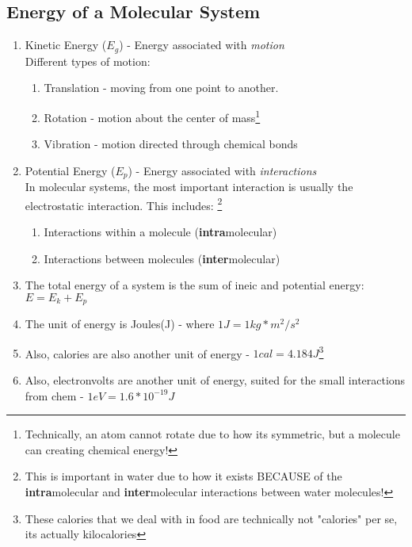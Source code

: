 \documentclass{article}  %
\begin{document}
\subsection*{Energy of a Molecular System}
\begin{enumerate}
    \item Kinetic Energy ($E_g$) - Energy associated with \emph{motion} \\
    Different types of motion:
        \begin{enumerate}
            \item Translation - moving from one point to another.
            \item Rotation - motion about the center of mass\footnote{Technically, an atom cannot rotate due to how its symmetric, but a molecule can creating chemical energy!}
            \item Vibration - motion directed through chemical bonds
        \end{enumerate}
    \item Potential Energy ($E_p$) - Energy associated with \emph{interactions} \\
    In molecular systems, the most important interaction is usually the electrostatic interaction. This includes: \footnote{This is important in water due to how it exists BECAUSE of the \textbf{intra}molecular and \textbf{inter}molecular interactions between water molecules!}
        \begin{enumerate}
            \item Interactions within a molecule (\textbf{intra}molecular)
            \item Interactions between molecules (\textbf{inter}molecular)
        \end{enumerate}
    \item The total energy of a system is the sum of ineic and potential energy: $E = E_k + E_p$
    \item The unit of energy is Joules(J) - where $1J = 1kg*m^2/s^2$
    \item Also, calories are also another unit of energy - $1cal = 4.184J$\footnote{These calories that we deal with in food are technically not "calories" per se, its actually kilocalories}
    \item Also, electronvolts are another unit of energy, suited for the small interactions from chem - $1 eV = 1.6*10^{-19}J$
\end{enumerate}
\end{document}
